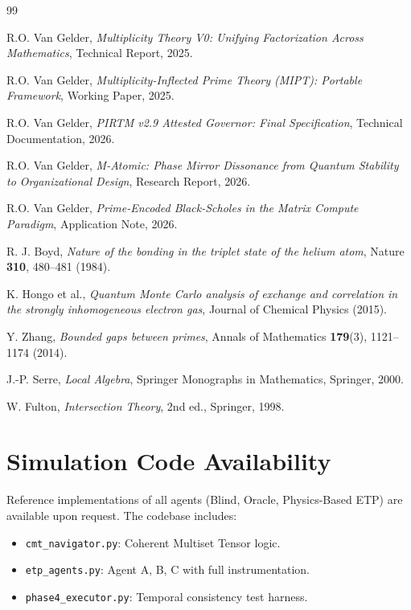 \documentclass[12pt,a4paper]{article}
\begin{document}
\begin{thebibliography}{99}

R.O. Van Gelder,
\textit{Multiplicity Theory V0: Unifying Factorization Across Mathematics},
Technical Report, 2025.

R.O. Van Gelder,
\textit{Multiplicity-Inflected Prime Theory (MIPT): Portable Framework},
Working Paper, 2025.

R.O. Van Gelder,
\textit{PIRTM v2.9 Attested Governor: Final Specification},
Technical Documentation, 2026.

R.O. Van Gelder,
\textit{M-Atomic: Phase Mirror Dissonance from Quantum Stability to Organizational Design},
Research Report, 2026.

R.O. Van Gelder,
\textit{Prime-Encoded Black-Scholes in the Matrix Compute Paradigm},
Application Note, 2026.

R. J. Boyd,
\textit{Nature of the bonding in the triplet state of the helium atom},
Nature \textbf{310}, 480--481 (1984).

K. Hongo et al.,
\textit{Quantum Monte Carlo analysis of exchange and correlation in the strongly inhomogeneous electron gas},
Journal of Chemical Physics (2015).

Y. Zhang,
\textit{Bounded gaps between primes},
Annals of Mathematics \textbf{179}(3), 1121--1174 (2014).

J.-P. Serre,
\textit{Local Algebra},
Springer Monographs in Mathematics, Springer, 2000.

W. Fulton,
\textit{Intersection Theory}, 2nd ed.,
Springer, 1998.

\end{thebibliography}

\appendix

\section{Simulation Code Availability}

Reference implementations of all agents (Blind, Oracle, Physics-Based ETP) are available upon request. The codebase includes:
\begin{itemize}
\item \texttt{cmt\_navigator.py}: Coherent Multiset Tensor logic.
\item \texttt{etp\_agents.py}: Agent A, B, C with full instrumentation.
\item \texttt{phase4\_executor.py}: Temporal consistency test harness.
\end{itemize}
\end{document}
